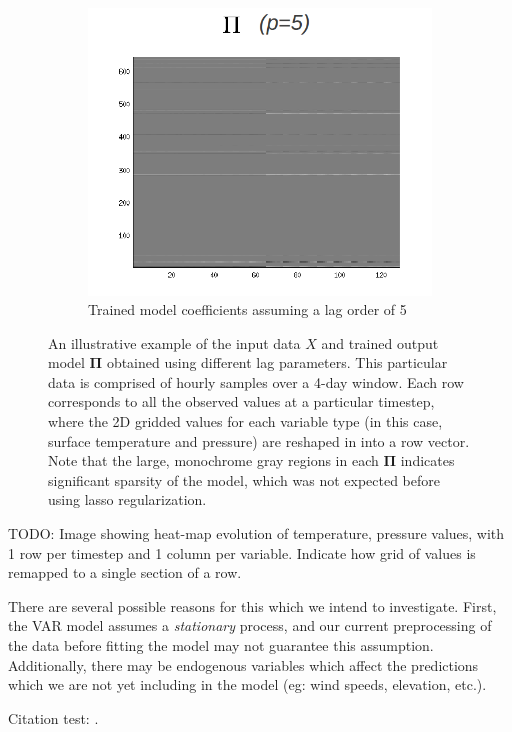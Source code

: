 \documentclass{article} %
\newcommand{\bs}{\boldsymbol}
\newcommand{\VARdata}{X}
\newcommand{\VARmodel}{\bs{\Pi}}
\begin{document}
\begin{figure}
\begin{subfigure}{0.2\textwidth}
\end{subfigure}
\begin{subfigure}{0.6\textwidth}
	\includegraphics[width=1.0\textwidth]{./var_params_lag_5.png}
	\caption{Trained model coefficients assuming a lag order of 5}
\end{subfigure}
\caption{An illustrative example of the input data $\VARdata$ and trained output model $\VARmodel$ obtained using different lag parameters. This particular data is comprised of hourly samples over a 4-day window. Each row corresponds to all the observed values at a particular timestep, where the 2D gridded values for each variable type (in this case, surface temperature and pressure) are reshaped in into a row vector. Note that the large, monochrome gray regions in each $\VARmodel$ indicates significant sparsity of the model, which was not expected before using lasso regularization. }
\label{fig:var_data_example}
\end{figure}

TODO: Image showing heat-map evolution of temperature, pressure values, with 1 row per timestep and 1 column per variable. Indicate how grid of values is remapped to a single section of a row.

There are several possible reasons for this which we intend to investigate. First, the VAR model assumes a \emph{stationary} process, and our current preprocessing of the data before fitting the model may not guarantee this assumption. Additionally, there may be endogenous variables which affect the predictions which we are not yet including in the model (eg: wind speeds, elevation, etc.). 

Citation test: \cite{Durban2001}.



\end{document}
